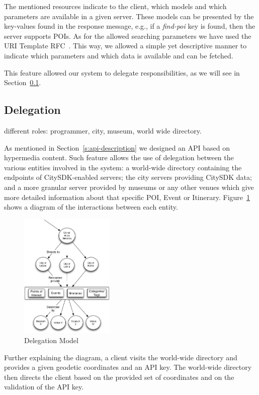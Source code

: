 \documentclass[times]{ettauth}
\begin{document}
The mentioned resources indicate to the client, which models and which parameters are available in a given server. These models can be presented by the key-values found in the response message, e.g., if a \textit{find-poi} key is found, then the server supports \acp{POI}. As for the allowed searching parameters we have used the URI Template RFC~\cite{uri-template}. This way, we allowed a simple yet descriptive manner to indicate which parameters and which data is available and can be fetched.

This feature allowed our system to delegate responsibilities, as we will see in Section~\ref{delegation}.

\subsection{Delegation}
\label{delegation}

different roles: programmer, city, museum, world wide directory.


As mentioned in Section~\ref{s:api-description} we designed an API based on hypermedia content. Such feature allows the use of delegation between the various entities involved in the system: a world-wide directory containing the endpoints of CitySDK-enabled servers; the city servers providing CitySDK data; and a more granular server provided by museums or any other venues which give more detailed information about that specific \ac{POI}, Event or Itinerary. Figure~\ref{fig:delegation} shows a diagram of the interactions between each entity.

\begin{figure}
\centering
\includegraphics[width=0.4\textwidth]{images/delegation}
\caption{Delegation Model}
\label{fig:delegation}
\end{figure}

Further explaining the diagram, a client visits the world-wide directory and provides a given geodetic coordinates and an API key. The world-wide directory then directs the client based on the provided set of  coordinates and on the validation of the API key.
\end{document}
